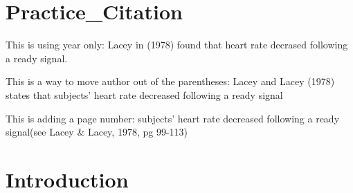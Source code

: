 \documentclass[
  man]{apa6}
\begin{document}
\hypertarget{practice_citation}{%
\section{Practice\_Citation}\label{practice_citation}}

This is using year only: Lacey in (1978) found that heart rate decrased following a ready signal.

This is a way to move author out of the parentheses: Lacey and Lacey (1978) states that subjects' heart rate decreased following a ready signal

This is adding a page number: subjects' heart rate decreased following a ready signal(see Lacey \& Lacey, 1978, pg 99-113)

\hypertarget{introduction}{%
\section{Introduction}\label{introduction}}
\end{document}
